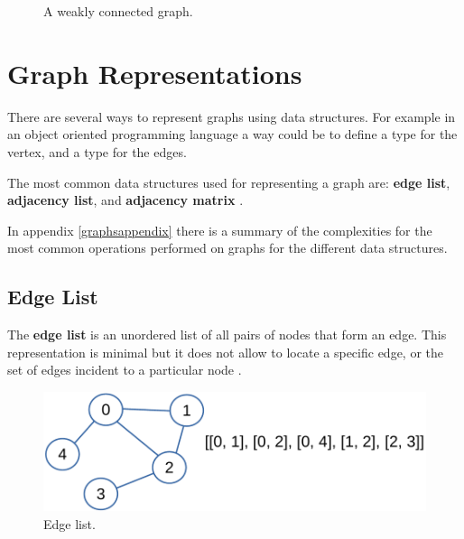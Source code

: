 \begin{figure}[H]
\centering
{}  
\caption[A weakly connected graph.]{A weakly connected graph.}
\label{graphs_2}
\end{figure}

\section{Graph Representations}
There are several ways to represent graphs using data structures. For example in an object oriented programming language a way could be to define a type for the vertex, and a type for the edges.

The most common data structures used for representing a graph are: \textbf{edge list}, \textbf{adjacency list}, and \textbf{adjacency matrix} \cite{goodrich2013data}. 

In appendix \ref{graphsappendix} there is a summary of the complexities for the most common operations performed on graphs for the different data structures.

\subsection{Edge List}
The \textbf{edge list} is an unordered list of all pairs of nodes that form an edge. This representation is minimal but it does not allow to locate a specific edge, or the set of edges incident to a particular node \cite{goodrich2013data}.

\begin{figure}[H]
	\begin{center}
		\includegraphics[scale=.6]{chapters/graphs/images/graphs_3.pdf}
		\caption[Edge list.]{Edge list.}
		\label{graphs_3}
	\end{center}
\end{figure}

